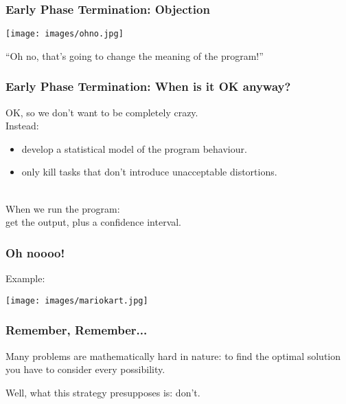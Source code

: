 \begin{frame}
  \frametitle{Early Phase Termination: Objection}

\begin{center}
	\texttt{[image: images/ohno.jpg]}
\end{center}

\begin{center}
``Oh no, that's going to change the meaning of the program!''
\end{center}
\end{frame}

\begin{frame}
  \frametitle{Early Phase Termination: When is it OK anyway?}


OK, so we don't want to be completely crazy.\\[1em]

Instead: 
\begin{itemize}
\item develop a statistical model of the program behaviour.
\item only kill tasks that don't introduce unacceptable distortions.
\end{itemize}

~\\[1em]

When we run the program: \\ \qquad get the output, plus a confidence interval.



\end{frame}



\begin{frame}
\frametitle{Oh noooo!}

Example:
\begin{center}
	\texttt{[image: images/mariokart.jpg]}
\end{center}

\end{frame}



\begin{frame}
\frametitle{Remember, Remember...}

Many problems are mathematically hard in nature: to find the optimal solution you have to consider every possibility. 

Well, what this strategy presupposes is: don't.

\end{frame}



